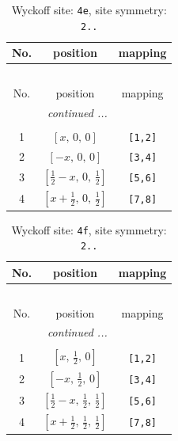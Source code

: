 \documentclass[fleqn,8pt]{jsarticle}
\begin{document}
\begin{longtable}{ccc}
\caption{Wyckoff site: {\tt 4e}, site symmetry: {\tt 2..}}
 \\
 \hline \hline
No. & position & mapping \\ \hline \endfirsthead

\multicolumn{2}{l}{\tablename\ \thetable{}} \\
 \hline \hline
No. & position & mapping \\ \hline \endhead

 \hline \hline
\multicolumn{2}{r}{\footnotesize\it continued ...} \\ \endfoot

 \hline \hline
\multicolumn{2}{r}{} \\ \endlastfoot

1 & $\left[ x,\, 0,\, 0 \right]$ & {\tt [1,2]} \\ \hline
2 & $\left[ - x,\, 0,\, 0 \right]$ & {\tt [3,4]} \\ \hline
3 & $\left[ \frac{1}{2} - x,\, 0,\, \frac{1}{2} \right]$ & {\tt [5,6]} \\ \hline
4 & $\left[ x + \frac{1}{2},\, 0,\, \frac{1}{2} \right]$ & {\tt [7,8]} \\
\end{longtable}
\renewcommand{\arraystretch}{1.2}
\begin{longtable}{ccc}
\caption{Wyckoff site: {\tt 4f}, site symmetry: {\tt 2..}}
 \\
 \hline \hline
No. & position & mapping \\ \hline \endfirsthead

\multicolumn{2}{l}{\tablename\ \thetable{}} \\
 \hline \hline
No. & position & mapping \\ \hline \endhead

 \hline \hline
\multicolumn{2}{r}{\footnotesize\it continued ...} \\ \endfoot

 \hline \hline
\multicolumn{2}{r}{} \\ \endlastfoot

1 & $\left[ x,\, \frac{1}{2},\, 0 \right]$ & {\tt [1,2]} \\ \hline
2 & $\left[ - x,\, \frac{1}{2},\, 0 \right]$ & {\tt [3,4]} \\ \hline
3 & $\left[ \frac{1}{2} - x,\, \frac{1}{2},\, \frac{1}{2} \right]$ & {\tt [5,6]} \\ \hline
4 & $\left[ x + \frac{1}{2},\, \frac{1}{2},\, \frac{1}{2} \right]$ & {\tt [7,8]} \\
\end{longtable}
\end{document}
